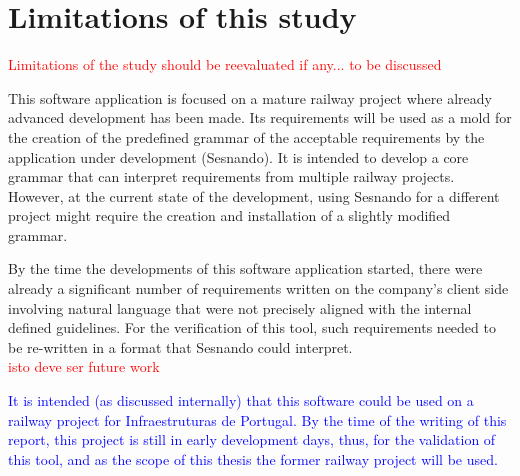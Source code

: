 \chapter{Limitations of this study}
\label{ch:limitations}

\textcolor{red}{Limitations of the study should be reevaluated if any... to be discussed}

This software application is focused on a mature railway project where already advanced development has been made. Its requirements will be used as a mold for the creation of the predefined grammar of the acceptable requirements by the application under development (Sesnando). It is intended to develop a core grammar that can interpret requirements from multiple railway projects. However, at the current state of the development, using Sesnando for a different project might require the creation and installation of a slightly modified grammar.

By the time the developments of this software application started, there were already a significant number of requirements written on the company's client side involving natural language that were not precisely aligned with the internal defined guidelines. For the verification of this tool, such requirements needed to be re-written in a format that Sesnando could interpret.\\

\textcolor{red}{isto deve ser future work}

\textcolor{blue}{ It is intended (as discussed internally) that this software could be used on a railway project for Infraestruturas de Portugal. By the time of the writing of this report, this project is still in early development days, thus, for the validation of this tool, and as the scope of this thesis the former railway project will be used.\\}
